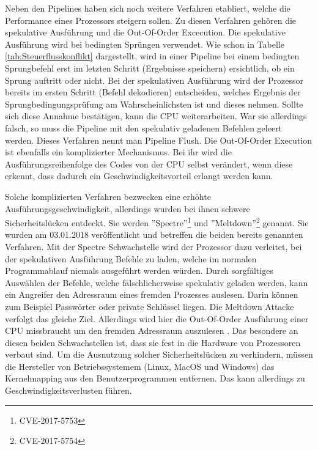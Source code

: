 \documentclass[12pt]{article}
\begin{document}
\par\bigskip\noindent Neben den Pipelines haben sich noch weitere Verfahren etabliert, welche die Performance eines Prozessors steigern sollen. Zu diesen Verfahren gehören die spekulative Ausführung und die Out-Of-Order Excecution. Die spekulative Ausführung wird bei bedingten Sprüngen verwendet. Wie schon in Tabelle \ref{tab:Steuerflusskonflikt} dargestellt, wird in einer Pipeline bei einem bedingten Sprungbefehl erst im letzten Schritt (Ergebnisse speichern) ersichtlich, ob ein Sprung auftritt oder nicht. Bei der spekulativen Ausführung wird der Prozessor bereits im ersten Schritt (Befehl dekodieren) entscheiden, welches Ergebnis der Sprungbedingungsprüfung am Wahrscheinlichsten ist und dieses nehmen. Sollte sich diese Annahme bestätigen, kann die CPU weiterarbeiten. War sie allerdings falsch, so muss die Pipeline mit den spekulativ geladenen Befehlen geleert werden. Dieses Verfahren nennt man Pipeline Flush. \cite{mikroprozessortechnik2011} \newpage\noindent Die Out-Of-Order Execution ist ebenfalls ein komplizierter Mechanismus. Bei ihr wird die Ausführungsreihenfolge des Codes von der CPU selbst verändert, wenn diese erkennt, dass dadurch ein Geschwindigkeitsvorteil erlangt werden kann. 

\par\bigskip\noindent Solche komplizierten Verfahren bezwecken eine erhöhte Ausführungsgeschwindigkeit, allerdings wurden bei ihnen schwere Sicherheitslücken entdeckt. Sie werden ''Spectre''\footnote{CVE-2017-5753} und ''Meltdown''\footnote{CVE-2017-5754} genannt. Sie wurden am 03.01.2018 veröffentlicht und betreffen die beiden bereits genannten Verfahren. Mit der Spectre Schwachstelle wird der Prozessor dazu verleitet, bei der spekulativen Ausführung Befehle zu laden, welche im normalen Programmablauf niemals ausgeführt werden würden. Durch sorgfältiges Auswählen der Befehle, welche fälschlicherweise spekulativ geladen werden, kann ein Angreifer den Adressraum eines fremden Prozesses auslesen. Darin können zum Beispiel Passwörter oder private Schlüssel liegen\cite{spectre}. Die Meltdown Attacke verfolgt das gleiche Ziel. Allerdings wird hier die Out-Of-Order Ausführung einer CPU missbraucht um den fremden Adressraum auszulesen \cite{meltdown}. Das besondere an diesen beiden Schwachstellen ist, dass sie fest in die Hardware von Prozessoren verbaut sind. Um die Ausnutzung solcher Sicherheitslücken zu verhindern, müssen die Hersteller von Betriebssystemem (Linux, MacOS und Windows) das Kernelmapping aus den Benutzerprogrammen entfernen. Das kann allerdings zu Geschwindigkeitsverlusten führen.
\end{document}
